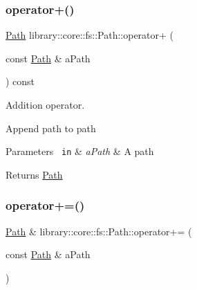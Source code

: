 \subsubsection{\texorpdfstring{operator+()}{operator+()}}
{\footnotesize\ttfamily \mbox{\hyperlink{classlibrary_1_1core_1_1fs_1_1_path}{Path}} library\+::core\+::fs\+::\+Path\+::operator+ (\begin{DoxyParamCaption}\item[{const \mbox{\hyperlink{classlibrary_1_1core_1_1fs_1_1_path}{Path}} \&}]{a\+Path }\end{DoxyParamCaption}) const}



Addition operator. 

\begin{DoxyVerb}                Append path to path
\end{DoxyVerb}



\begin{DoxyCode}{0}
\end{DoxyCode}



\begin{DoxyParams}[1]{Parameters}
\mbox{\texttt{ in}}  & {\em a\+Path} & A path \\
\hline
\end{DoxyParams}
\begin{DoxyReturn}{Returns}
\mbox{\hyperlink{classlibrary_1_1core_1_1fs_1_1_path}{Path}} 
\end{DoxyReturn}
\mbox{\label{classlibrary_1_1core_1_1fs_1_1_path_a79ce7b2d9ac53e3bb22240f8cd5c883a}} 
\subsubsection{\texorpdfstring{operator+=()}{operator+=()}}
{\footnotesize\ttfamily \mbox{\hyperlink{classlibrary_1_1core_1_1fs_1_1_path}{Path}} \& library\+::core\+::fs\+::\+Path\+::operator+= (\begin{DoxyParamCaption}\item[{const \mbox{\hyperlink{classlibrary_1_1core_1_1fs_1_1_path}{Path}} \&}]{a\+Path }\end{DoxyParamCaption})}



